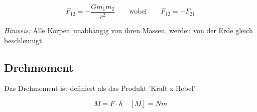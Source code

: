 \documentclass[7pt]{article}
\begin{document}
\begin{multicols*}{3}
\begin{equation*}
	F_{12} = -\frac{Gm_1m_2}{r^2}\qquad\text{wobei}\qquad F_{12} = -F_{21}
\end{equation*}

\emph{Hinweis:} Alle K{\"o}rper, unabh{\"a}ngig von ihren Massen, werden von der Erde gleich beschleunigt.

\subsection{Drehmoment}

Das Drehmoment ist definiert als das Produkt 'Kraft x Hebel'

\begin{equation*}
	M = F \cdot h \quad [M] = Nm
\end{equation*}

\end{multicols*}
\end{document}
